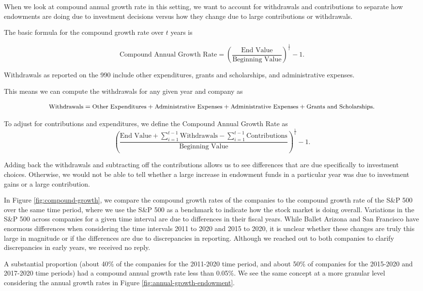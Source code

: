 \documentclass[Dance Data
Project,article,submit,moreauthors,pdftex]{mdpi}
\begin{document}
When we look at compound annual growth rate in this setting, we want to
account for withdrawals and contributions to separate how endowments are
doing due to investment decisions versus how they change due to large
contributions or withdrawals.

The basic formula for the compound growth rate over \(t\) years is

\[{\text{Compound Annual Growth Rate} = \left( \frac{\text{End Value}}{\text{Beginning Value}}\right)^{\frac{1}{t}}-1}.\]

Withdrawals as reported on the 990 include other expenditures, grants
and scholarships, and administrative expenses.

This means we can compute the withdrawals for any given year and company
as

\[\small{\text{Withdrawals} = \text{Other Expenditures} +\text{Administrative Expenses} +\text{Administrative Expenses} + \text{Grants and Scholarships}}.\]

To adjust for contributions and expenditures, we define the Compound
Annual Growth Rate as
\[{\left( \frac{\text{End Value} + \sum_{i=1}^{t-1} \text{Withdrawals} - \sum_{i=1}^{t-1} \text{Contributions}  }{\text{Beginning Value}} \right)^{\frac{1}{t}}-1}.\]

Adding back the withdrawals and subtracting off the contributions allows
us to see differences that are due specifically to investment choices.
Otherwise, we would not be able to tell whether a large increase in
endowment funds in a particular year was due to investment gains or a
large contribution.

In Figure \ref{fig:compound-growth}, we compare the compound growth
rates of the companies to the compound growth rate of the S\&P 500 over
the same time period, where we use the S\&P 500 as a benchmark to
indicate how the stock market is doing overall. Variations in the S\&P
500 across companies for a given time interval are due to differences in
their fiscal years. While Ballet Arizona and San Francisco have enormous
differences when considering the time intervals 2011 to 2020 and 2015 to
2020, it is unclear whether these changes are truly this large in
magnitude or if the differences are due to discrepancies in reporting.
Although we reached out to both companies to clarify discrepancies in
early years, we received no reply.

A substantial proportion (about 40\% of the companies for the 2011-2020
time period, and about 50\% of companies for the 2015-2020 and 2017-2020
time periods) had a compound annual growth rate less than 0.05\%. We see
the same concept at a more granular level considering the annual growth
rates in Figure \ref{fig:annual-growth-endowment}.
\end{document}
